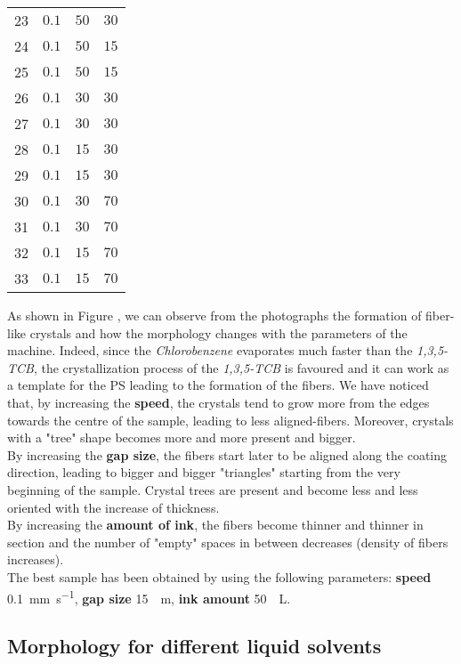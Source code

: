 \documentclass  [
  paper    = a4,
  BCOR     = 10mm,
  twoside,
  fontsize = 12pt,
  fleqn,
  toc      = bibnumbered,
  toc      = listofnumbered,
  numbers  = noendperiod,
  headings = normal,
  listof   = leveldown,
  version  = 3.03
]                                       {scrreprt}
\begin{document}
\begin{table*}[tb]
\begin{tabular}{c|ccc}
		23 & $0.1$ & $50$ & $30$\\
		24 & $0.1$ & $50$ & $15$\\
		25 & $0.1$ & $50$ & $15$\\
		\midrule
		26 & $0.1$ & $30$ & $30$\\
		27 & $0.1$ & $30$ & $30$\\
		28 & $0.1$ & $15$ & $30$\\
		29 & $0.1$ & $15$ & $30$\\
		\midrule
		30 & $0.1$ & $30$ & $70$\\
		31 & $0.1$ & $30$ & $70$\\
		32 & $0.1$ & $15$ & $70$\\
		33 & $0.1$ & $15$ & $70$\\
		\hline
	\end{tabular}
\end{table*}

As shown in Figure , we can observe from the photographs the formation of fiber-like crystals and how the morphology changes with the parameters of the machine. Indeed, since the \emph{Chlorobenzene} evaporates much faster than the \emph{1,3,5-TCB}, the crystallization process of the \emph{1,3,5-TCB} is favoured and it can work as a template for the PS leading to the formation of the fibers. We have noticed that, by increasing the \textbf{speed}, the crystals tend to grow more from the edges towards the centre of the sample, leading to less aligned-fibers. Moreover, crystals with a "tree" shape becomes more and more present and bigger.\\

By increasing the \textbf{gap size}, the fibers start later to be aligned along the coating direction, leading to bigger and bigger "triangles" starting from the very beginning of the sample.  Crystal trees are present and become less and less oriented with the increase of thickness.\\

By increasing the \textbf{amount of ink}, the fibers become thinner and thinner in section and the number of "empty" spaces in between decreases (density of fibers increases).\\

The best sample has been obtained by using the following parameters: \textbf{speed} \SI[per-mode=symbol]{0.1}{\milli\meter\per\second}, \textbf{gap size} \SI{15}{\mu \meter}, \textbf{ink amount} \SI{50}{\mu \liter}.\\


	\subsection{Morphology for different liquid solvents}\label{sec:liquids}
\end{document}
